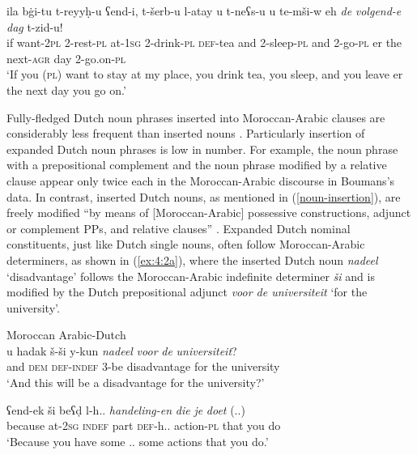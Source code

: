 \ex{\label{ex:4:1c}}
\gll ila bġi-tu t-reyyḥ-u ʕend-i, t-šerb-u l-atay u t-neʕs-u u te-mši-w eh \textit{de} \textit{volgend-e} \textit{dag} t-zid-u!\\
	if want-\textsc{2pl} 2-rest-\textsc{pl} at-\textsc{1sg} 2-drink-\textsc{pl} \textsc{def}-tea and 2-sleep-\textsc{pl} and 2-go-\textsc{pl} er the next-\textsc{agr} day 2-go.on-\textsc{pl}\\
\glt `If you (\textsc{pl}) want to stay at my place, you drink tea, you sleep, and you leave er the next day you go on.'
\z
\z

\noindent Fully-fledged Dutch noun phrases inserted into Moroccan-Arabic clauses are considerably less frequent than inserted nouns \citep[cf.][210]{boumans-syntax-1998}. Particularly insertion of expanded Dutch noun phrases is low in number. For example, the noun phrase with a prepositional complement and the noun phrase modified by a relative clause appear only twice each in the Moroccan-Arabic discourse in Boumans's data. In contrast, inserted Dutch nouns, as mentioned in (\ref{noun-insertion}), are freely modified ``by means of [Moroccan-Arabic] possessive constructions, adjunct or complement PPs, and relative clauses'' \citep[201]{boumans-syntax-1998}. Expanded Dutch nominal constituents, just like Dutch single nouns, often follow  Moroccan-Arabic determiners, as shown in  (\ref{ex:4:2a}), where the inserted Dutch noun \textit{nadeel} `disadvantage' follows the Moroccan-Arabic indefinite determiner \textit{ši} and is modified by the Dutch prepositional adjunct \textit{voor de universiteit} `for the university'.

\ea
Moroccan Arabic-Dutch \citep[198, 192]{boumans-syntax-1998}\\

\ea{\label{ex:4:2a}}
\gll u hadak š-ši y-kun \textit{nadeel} \textit{voor} \textit{de} \textit{universiteit}?\\
	and \textsc{dem} \textsc{def-indef}  3-be disadvantage for the university\\
\glt `And this will be a disadvantage for the university?'

\ex{\label{ex:4:2b}}
 ʕend-ek ši  beʕḍ l-h.. \textit{handeling-en} \textit{die} \textit{je} {\textit{doet} (..)}\\
	because at-\textsc{2sg} \textsc{indef} part \textsc{def}-h.. action-\textsc{pl} that you do\\
\glt `Because you have some .. some actions that you do.'
\z
\z


